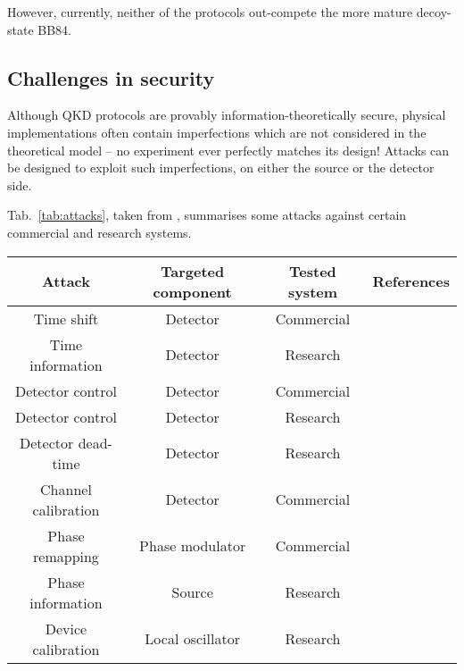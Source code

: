 However, currently, neither of the protocols out-compete the more mature decoy-state BB84.

\subsection{Challenges in security}

Although QKD protocols are provably information-theoretically secure, physical implementations often contain imperfections which are not considered in the theoretical model -- no experiment ever perfectly matches its design! Attacks can be designed to exploit such imperfections, on either the source or the detector side.

Tab.~\ref{tab:attacks}, taken from \cite{bib:lo2014secure}, summarises some attacks against certain commercial and research systems.

\startnormtable
\begin{table*}[!htbp]
\begin{tabular}{|c|c|c|c|} 
 \hline
 Attack &  Targeted component & Tested system & References\\ 
  \hline
  \hline
Time shift
        & Detector & Commercial & \cite{bib:qi2005time, bib:PhysRevA.78.042333, bib:PhysRevA.74.022313}\\
Time information & Detector & Research & \cite{bib:lamas2007breaking} \\
Detector control & Detector  &   Commercial & \cite{bib:lydersen2010hacking, bib:yuan2010avoiding}\\
Detector control  & Detector  & Research & \cite{bib:gerhardt2011full} \\
Detector dead-time      & Detector  & Research   & \cite{bib:weier2011quantum}      \\
Channel calibration    & Detector  &  Commercial  & \cite{bib:jain2011device}      \\
Phase remapping  &  Phase modulator & Commercial & \cite{bib:xu2010experimental} \\
Phase information & Source & Research & \cite{bib:tang2013source}          \\
Device calibration  & Local oscillator & Research & \cite{bib:jouguet2013preventing} \\
                \hline
\end{tabular}
\captionspacetab \caption{\label{tab:attacks} Summary of various attacks against some commercial and 
research QKD systems.}
\end{table*}
\startalgtable

